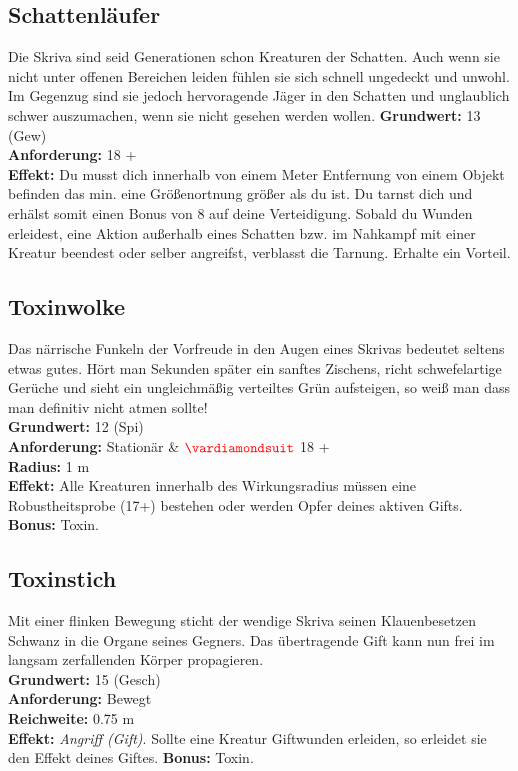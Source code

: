 \subsection*{Schattenläufer}
Die Skriva sind seid Generationen schon Kreaturen der Schatten. Auch wenn sie nicht unter offenen Bereichen leiden fühlen sie sich schnell ungedeckt und unwohl. Im Gegenzug sind sie jedoch hervoragende Jäger in den Schatten und unglaublich schwer auszumachen, wenn sie nicht gesehen werden wollen.
\textbf{Grundwert:} 13 (Gew) \\
\textbf{Anforderung:} 18 +\\
\textbf{Effekt:} Du musst dich innerhalb von einem Meter Entfernung von einem Objekt befinden das min. eine Größenortnung größer als du ist. Du tarnst dich und erhälst somit einen Bonus von 8 auf deine Verteidigung. Sobald du Wunden erleidest, eine Aktion außerhalb eines Schatten bzw. im Nahkampf mit einer Kreatur beendest oder selber angreifst, verblasst die Tarnung. Erhalte ein Vorteil.

\subsection*{Toxinwolke}
Das närrische Funkeln der Vorfreude in den Augen eines Skrivas bedeutet seltens etwas gutes. Hört man Sekunden später ein sanftes Zischens, richt schwefelartige Gerüche und sieht ein ungleichmäßig verteiltes Grün aufsteigen, so weiß man dass man definitiv nicht atmen sollte! \\
\textbf{Grundwert:} 12 (Spi) \\
\textbf{Anforderung:} Stationär \& $\Karo{}$ 18 +\\
\textbf{Radius:} 1 m \\
\textbf{Effekt:} Alle Kreaturen innerhalb des Wirkungsradius müssen eine Robustheitsprobe (17+) bestehen oder werden Opfer deines aktiven Gifts.
\textbf{Bonus:} Toxin.

\subsection*{Toxinstich}
Mit einer flinken Bewegung sticht der wendige Skriva seinen Klauenbesetzen Schwanz in die Organe seines Gegners. Das übertragende Gift kann nun frei im langsam zerfallenden Körper propagieren.\\
\textbf{Grundwert:} 15 (Gesch) \\
\textbf{Anforderung:} Bewegt \\
\textbf{Reichweite:} 0.75 m \\
\textbf{Effekt:} \textit{Angriff (Gift)}. Sollte eine Kreatur Giftwunden erleiden, so erleidet sie den Effekt deines Giftes. \textbf{Bonus:} Toxin.

